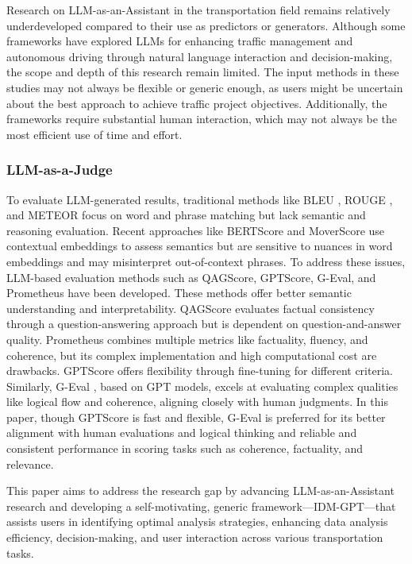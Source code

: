 Research on LLM-as-an-Assistant in the transportation field remains relatively underdeveloped compared to their use as predictors or generators. Although some frameworks have explored LLMs for enhancing traffic management and autonomous driving through natural language interaction and decision-making, the scope and depth of this research remain limited. The input methods in these studies may not always be flexible or generic enough, as users might be uncertain about the best approach to achieve traffic project objectives. Additionally, the frameworks require substantial human interaction, which may not always be the most efficient use of time and effort. 

\subsubsection{LLM-as-a-Judge}
To evaluate LLM-generated results, traditional methods like BLEU \cite{papineni2002bleu}, ROUGE \cite{lin2004rouge}, and METEOR \cite{banerjee2005meteor} focus on word and phrase matching but lack semantic and reasoning evaluation. Recent approaches like BERTScore \cite{zhang2019bertscore} and MoverScore \cite{zhao2019moverscore} use contextual embeddings to assess semantics but are sensitive to nuances in word embeddings and may misinterpret out-of-context phrases. To address these issues, LLM-based evaluation methods such as QAGScore, GPTScore, G-Eval, and Prometheus have been developed. These methods offer better semantic understanding and interpretability. QAGScore \cite{fabbri2021qafacteval} evaluates factual consistency through a question-answering approach but is dependent on question-and-answer quality. Prometheus \cite{kim2023prometheus} combines multiple metrics like factuality, fluency, and coherence, but its complex implementation and high computational cost are drawbacks. GPTScore \cite{fu2023gptscore} offers flexibility through fine-tuning for different criteria. Similarly, G-Eval \cite{liu2023g}, based on GPT models, excels at evaluating complex qualities like logical flow and coherence, aligning closely with human judgments. In this paper, though GPTScore is fast and flexible, G-Eval is preferred for its better alignment with human evaluations and logical thinking and reliable and consistent performance in scoring tasks such as coherence, factuality, and relevance.

This paper aims to address the research gap by advancing LLM-as-an-Assistant research and developing a self-motivating, generic framework—IDM-GPT—that assists users in identifying optimal analysis strategies, enhancing data analysis efficiency, decision-making, and user interaction across various transportation tasks.